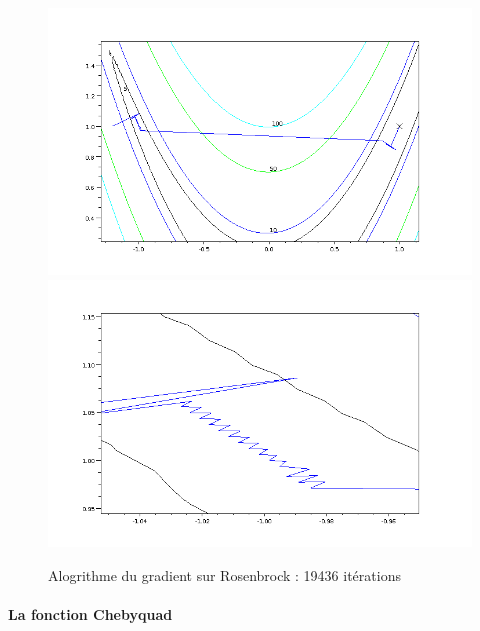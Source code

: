 \begin{figure}[h]
\caption{Alogrithme du gradient sur Rosenbrock : 19436 it\'erations}
\includegraphics[scale=0.3]{figures/gradient.png}
\includegraphics[scale=0.3]{figures/gradientzoom.png}
\label{fig:grarosenbrock}
\end{figure}




\paragraph{La fonction Chebyquad}


